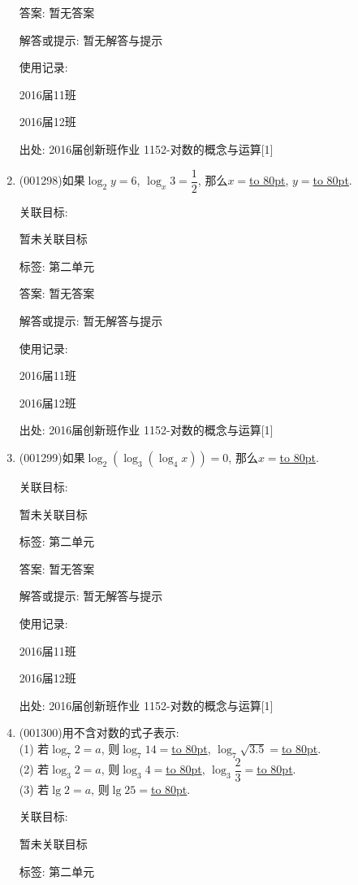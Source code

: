 \documentclass[10pt,a4paper]{article}
\newcommand{\blank}[1]{\underline{\hbox to #1pt{}}}
\begin{document}
\begin{enumerate}[1.]
答案: 暂无答案

解答或提示: 暂无解答与提示

使用记录:

2016届11班	

2016届12班	


出处: 2016届创新班作业	1152-对数的概念与运算[1]
\item { (001298)}如果$\log_2 y=6$, $\log_x 3=\dfrac{1}{2}$, 那么$x=$\blank{80}, $y=$\blank{80}.


关联目标:

暂未关联目标



标签: 第二单元

答案: 暂无答案

解答或提示: 暂无解答与提示

使用记录:

2016届11班	

2016届12班	


出处: 2016届创新班作业	1152-对数的概念与运算[1]
\item { (001299)}如果$\log_2(\log_3(\log_4x))=0$, 那么$x=$\blank{80}.


关联目标:

暂未关联目标



标签: 第二单元

答案: 暂无答案

解答或提示: 暂无解答与提示

使用记录:

2016届11班	

2016届12班	


出处: 2016届创新班作业	1152-对数的概念与运算[1]
\item { (001300)}用不含对数的式子表示:\\ 
(1) 若$\log_7 2=a$, 则$\log_7 14=$\blank{80}, $\log_7 \sqrt{3.5}=$\blank{80}.\\ 
(2) 若$\log_3 2=a$, 则$\log_3 4=$\blank{80}, $\log_3 \dfrac{2}{3}=$\blank{80}.\\ 
(3) 若$\lg 2=a$, 则$\lg 25=$\blank{80}.


关联目标:

暂未关联目标



标签: 第二单元


\end{enumerate}
\end{document}
